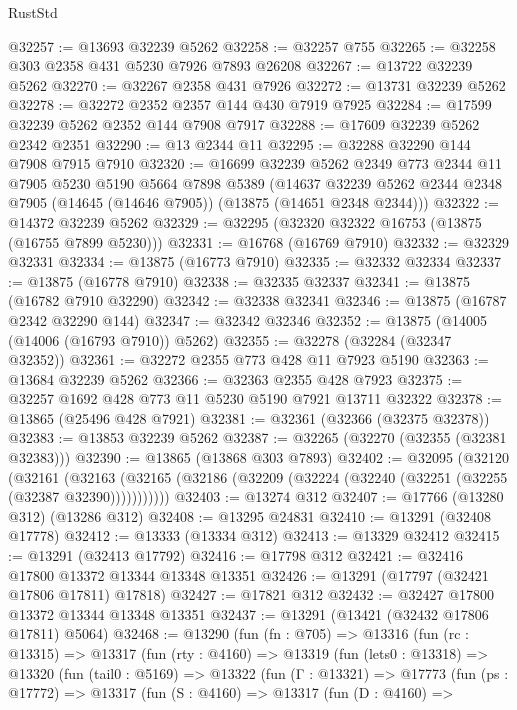 \begin{lexlean}{RustStd}
\begin{coremodule}
@32257 := @13693 @32239 @5262
@32258 := @32257 @755
@32265 := @32258 @303 @2358 @431 @5230 @7926 @7893 @26208
@32267 := @13722 @32239 @5262
@32270 := @32267 @2358 @431 @7926
@32272 := @13731 @32239 @5262
@32278 := @32272 @2352 @2357 @144 @430 @7919 @7925
@32284 := @17599 @32239 @5262 @2352 @144 @7908 @7917
@32288 := @17609 @32239 @5262 @2342 @2351
@32290 := @13 @2344 @11
@32295 := @32288 @32290 @144 @7908 @7915 @7910
@32320 := @16699
    @32239
    @5262
    @2349
    @773
    @2344
    @11
    @7905
    @5230
    @5190
    @5664
    @7898
    @5389
    (@14637 @32239 @5262 @2344 @2348 @7905 (@14645 (@14646 @7905)) (@13875 (@14651 @2348 @2344)))
@32322 := @14372 @32239 @5262
@32329 := @32295 (@32320 @32322 @16753 (@13875 (@16755 @7899 @5230)))
@32331 := @16768 (@16769 @7910)
@32332 := @32329 @32331
@32334 := @13875 (@16773 @7910)
@32335 := @32332 @32334
@32337 := @13875 (@16778 @7910)
@32338 := @32335 @32337
@32341 := @13875 (@16782 @7910 @32290)
@32342 := @32338 @32341
@32346 := @13875 (@16787 @2342 @32290 @144)
@32347 := @32342 @32346
@32352 := @13875 (@14005 (@14006 (@16793 @7910)) @5262)
@32355 := @32278 (@32284 (@32347 @32352))
@32361 := @32272 @2355 @773 @428 @11 @7923 @5190
@32363 := @13684 @32239 @5262
@32366 := @32363 @2355 @428 @7923
@32375 := @32257 @1692 @428 @773 @11 @5230 @5190 @7921 @13711 @32322
@32378 := @13865 (@25496 @428 @7921)
@32381 := @32361 (@32366 (@32375 @32378))
@32383 := @13853 @32239 @5262
@32387 := @32265 (@32270 (@32355 (@32381 @32383)))
@32390 := @13865 (@13868 @303 @7893)
@32402 := @32095
    (@32120
      (@32161
        (@32163 (@32165 (@32186 (@32209 (@32224 (@32240 (@32251 (@32255 (@32387 @32390)))))))))))
@32403 := @13274 @312
@32407 := @17766 (@13280 @312) (@13286 @312)
@32408 := @13295 @24831
@32410 := @13291 (@32408 @17778)
@32412 := @13333 (@13334 @312)
@32413 := @13329 @32412
@32415 := @13291 (@32413 @17792)
@32416 := @17798 @312
@32421 := @32416 @17800 @13372 @13344 @13348 @13351
@32426 := @13291 (@17797 (@32421 @17806 @17811) @17818)
@32427 := @17821 @312
@32432 := @32427 @17800 @13372 @13344 @13348 @13351
@32437 := @13291 (@13421 (@32432 @17806 @17811) @5064)
@32468 := @13290
    (fun (fn : @705) =>
    @13316
      (fun (rc : @13315) =>
      @13317
        (fun (rty : @4160) =>
        @13319
          (fun (lets0 : @13318) =>
          @13320
            (fun (tail0 : @5169) =>
            @13322
              (fun (Γ : @13321) =>
              @17773
                (fun (ps : @17772) =>
                @13317
                  (fun (S : @4160) =>
                  @13317
                    (fun (D : @4160) =>

\end{coremodule}
\end{lexlean}

